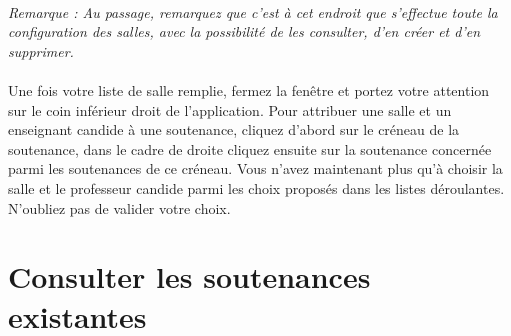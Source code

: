 \documentclass[a4paper,10pt]{report}
\begin{document}
	\paragraph{}  
	  \textit{Remarque : Au passage, remarquez que c'est à cet endroit que s'effectue toute la configuration des salles, avec la possibilité de les consulter, d'en créer et d'en supprimer.}
	  
	\paragraph{}
	  Une fois votre liste de salle remplie, fermez la fenêtre et portez votre attention sur le coin inférieur droit de l'application.
	  Pour attribuer une salle et un enseignant candide à une soutenance, cliquez d'abord sur le créneau de la soutenance, dans le cadre de droite cliquez ensuite sur la soutenance concernée parmi les soutenances de ce créneau.
	  Vous n'avez maintenant plus qu'à choisir la salle et le professeur candide parmi les choix proposés dans les listes déroulantes.
	  N'oubliez pas de valider votre choix.
	  
	
	\newpage
    \section{Consulter les soutenances existantes}
\end{document}
